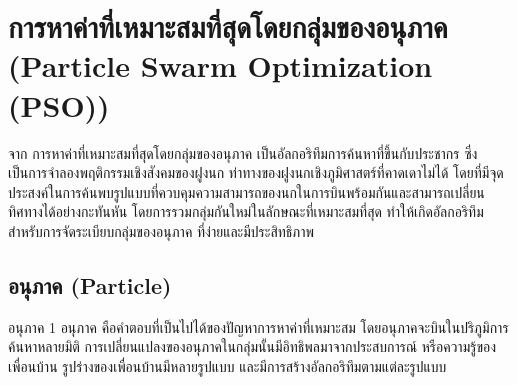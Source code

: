\section{การหาค่าที่เหมาะสมที่สุดโดยกลุ่มของอนุภาค (Particle Swarm Optimization (PSO))}
จาก \cite{Sansanee} การหาค่าที่เหมาะสมที่สุดโดยกลุ่มของอนุภาค เป็นอัลกอริทึมการค้นหาที่ขึ้นกับประชากร ซึ่งเป็นการจำลองพฤติกรรมเชิงสังคมของฝูงนก ท่าทางของฝูงนกเชิงภูมิศาสตร์ที่คาดเดาไม่ได้ โดยที่มีจุดประสงค์ในการค้นพบรูปแบบที่ควบคุมความสามารถของนกในการบินพร้อมกันและสามารถเปลี่ยนทิศทางได้อย่างกะทันหัน โดยการรวมกลุ่มกันใหม่ในลักษณะที่เหมาะสมที่สุด ทำให้เกิดอัลกอริทึมสำหรับการจัดระเบียบกลุ่มของอนุภาค ที่ง่ายและมีประสิทธิภาพ

\subsection{อนุภาค (Particle)}
อนุภาค 1 อนุภาค คือคำตอบที่เป็นไปได้ของปัญหาการหาค่าที่เหมาะสม โดยอนุภาคจะบินในปริภูมิการค้นหาหลายมิติ การเปลี่ยนแปลงของอนุภาคในกลุ่มนั้นมีอิทธิพลมาจากประสบการณ์ หรือความรู้ของเพื่อนบ้าน รูปร่างของเพื่อนบ้านมีหลายรูปแบบ และมีการสร้างอัลกอริทึมตามแต่ละรูปแบบ \cite{Engelbrecht}


